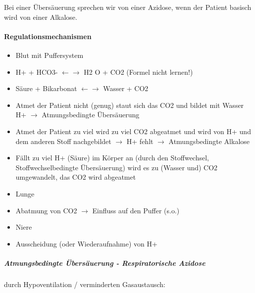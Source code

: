 \documentclass{article}
\begin{document}
Bei einer \"Ubers\"auerung sprechen wir von einer
Azidose, wenn der Patient basisch wird von einer
Alkalose.

\paragraph[\ Regulationsmechanismen]{ Regulationsmechanismen}
\begin{itemize}
\item Blut mit Puffersystem

\end{itemize}
\begin{itemize}
\item  %
%
H+ + HCO3- ${\leftarrow}$${\rightarrow}$ H2 O + CO2  (Formel nicht
lernen!)

\item S\"aure + Bikarbonat ${\leftarrow}$${\rightarrow}$ Wasser + CO2

\end{itemize}
\begin{itemize}
\item Atmet der Patient nicht (genug) staut sich das CO2 und bildet mit
Wasser H+ ${\rightarrow}$ Atmungsbedingte \"Ubers\"auerung

\item Atmet der Patient zu viel wird zu viel CO2 abgeatmet und wird von
H+ und dem anderen Stoff nachgebildet ${\rightarrow}$ H+ fehlt
${\rightarrow}$ Atmungsbedingte Alkalose

\item F\"allt zu viel H+ (S\"aure) im K\"orper an (durch den
Stoffwechsel, Stoffwechselbedingte \"Ubers\"auerung) wird es zu (Wasser
und) CO2 umgewandelt, das CO2 wird abgeatmet

\end{itemize}
\begin{itemize}
\item Lunge 

\end{itemize}
\begin{itemize}
\item Abatmung von CO2 ${\rightarrow}$ Einfluss auf den Puffer (s.o.)

\end{itemize}
\begin{itemize}
\item Niere

\end{itemize}
\begin{itemize}
\item Ausscheidung (oder Wiederaufnahme)  von H+

\end{itemize}
\subparagraph[Atmungsbedingte \"Ubers\"auerung - Respiratorische
Azidose]{Atmungsbedingte \"Ubers\"auerung - Respiratorische Azidose}
\label{bkm:RefHeading35233321}durch Hypoventilation / verminderten  Gasaustausch:
\end{document}

